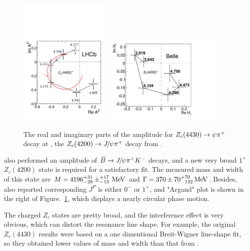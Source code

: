 \begin{figure}[!hbtp]
\centering
   \includegraphics[width=0.4\textwidth]{Figures/01_Introduction/Exotic/charged_particle/Argand-Z} %
   \includegraphics[width=0.52\textwidth]{Figures/01_Introduction/Exotic/charged_particle/Belle-Zc4200-Argand} %
   \caption{ 
   The real and imaginary parts of the amplitude for $Z_{c}(4430)\rightarrow\psi{\ensuremath{{\pi}^+}}$ decay at \lhcb\supercite{LHCb-PAPER-2014-014},  
   the $Z_{c}(4200)\rightarrow{\ensuremath{{J\mskip -3mu/\mskip -2mu\psi}}}{\ensuremath{{\pi}^+}}$ decay from \belle\supercite{PhysRevD.90.112009}.}
\label{fig:Z4430_argand}
\end{figure}

\belle also performed an amplitude of ${\kern 0.18em\overline{\kern -0.18em B}}\rightarrow{\ensuremath{{J\mskip -3mu/\mskip -2mu\psi}}}{\ensuremath{{\pi}^+}}{\ensuremath{{K}^-}}$ decays\supercite{PhysRevD.90.112009},
and a new very broad $1^{+}$ $Z_{c}(4200)$ state is required for a satisfactory fit.
The measured mass and width of this state are $M=4196^{+31}_{-29}\pm^{+17}_{-13} \text{\,Me\kern -0.1em V}$ and $\Gamma=370\pm70^{+70}_{-132} \text{\,Me\kern -0.1em V}$.
Besides,
\belle also reported corresponding $J^{P}$ is either $0^{-}$ or $1^{+}$,
and "Argand" plot is shown in the right of Figure.~\ref{fig:Z4430_argand},
which displays a nearly circular phase motion.

The charged $Z_{c}$ states are pretty broad,
and the interference effect is very obvious, 
which can distort the resonance line shape.
For example,
the original $Z_{c}(4430)$ results were based on a one dimentional Breit-Wigner line-shape fit,
so they obtained lower values of mass and width than that from \lhcb.


